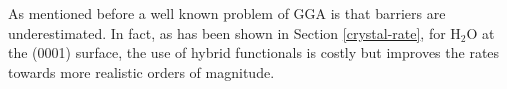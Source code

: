 \documentclass[11pt,DIV=13,BCOR=5mm,a4paper,headinclude]{scrbook}
\begin{document}
As mentioned before a well known problem of GGA is that barriers are underestimated\cite{Zhao05}.
In fact, as has been shown in Section \ref{crystal-rate}, for H$_2$O at the (0001) surface, the use of hybrid functionals is costly but improves the rates towards more realistic orders of magnitude.

\end{document}
